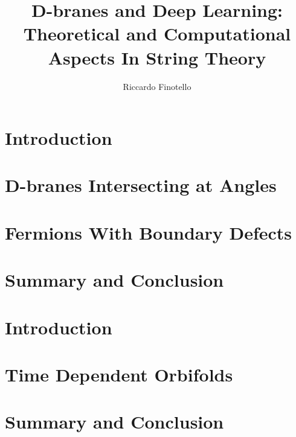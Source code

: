 \documentclass[a4paper,11pt,twoside]{thesis}
\author{Riccardo Finotello}
\title{D-branes and Deep Learning: \\ Theoretical and Computational Aspects In String Theory}
\begin{document}
\maketitlepage{}
\cleardoubleplainpage{}

\makefrontespice{}
\cleardoubleplainpage{}

\begin{abstractpage}
  
\end{abstractpage}
\cleardoubleplainpage{}

\begin{acknowledgmentspage}
  
\end{acknowledgmentspage}
\cleardoubleplainpage{}

\plaintoc{}


\label{part:cft}
\section{Introduction}

\section{D-branes Intersecting at Angles}

\section{Fermions With Boundary Defects}

\section{Summary and Conclusion}


\label{part:cosmo}
\section{Introduction}

\section{Time Dependent Orbifolds}

\section{Summary and Conclusion}

\end{document}
